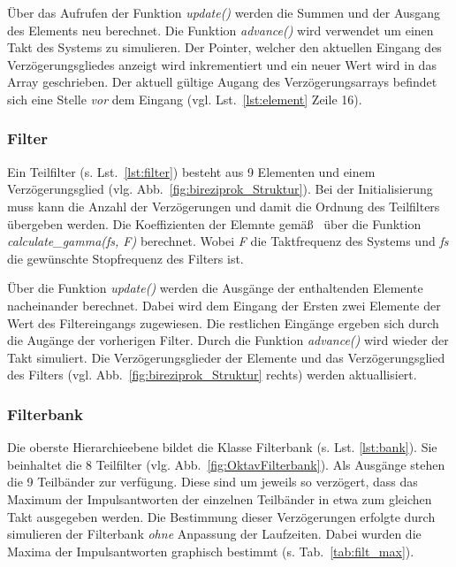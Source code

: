 Über das Aufrufen der Funktion \emph{update()} werden die Summen und der Ausgang des Elements neu berechnet. Die Funktion \emph{advance()} wird verwendet um einen Takt des Systems zu simulieren. Der Pointer, welcher den aktuellen Eingang des Verzögerungsgliedes anzeigt wird inkrementiert und ein neuer Wert wird in das Array geschrieben. Der aktuell gültige Augang des Verzögerungsarrays befindet sich eine Stelle \emph{vor} dem Eingang (vgl. Lst.~\ref{lst:element} Zeile 16).




\subsubsection{Filter}\label{sec:impl_Filter}
Ein Teilfilter (s. Lst.~\ref{lst:filter}) besteht aus 9 Elementen und einem Verzögerungsglied (vlg. Abb.~\ref{fig:bireziprok_Struktur}). Bei der Initialisierung muss kann die Anzahl der Verzögerungen und damit die Ordnung des Teilfilters übergeben werden. Die Koeffizienten der Elemnte gemäß~\cite{gaszi1983} über die Funktion \emph{calculate\_gamma(fs, F)} berechnet. Wobei \emph{F} die Taktfrequenz des Systems und \emph{fs} die gewünschte Stopfrequenz des Filters ist.

Über die Funktion \emph{update()} werden die Ausgänge der enthaltenden Elemente nacheinander berechnet. Dabei wird dem Eingang der Ersten zwei Elemente der Wert des Filtereingangs zugewiesen. Die restlichen Eingänge ergeben sich durch die Augänge der vorherigen Filter. Durch die Funktion \emph{advance()} wird wieder der Takt simuliert. Die Verzögerungsglieder der Elemente und das Verzögerungsglied des Filters (vgl. Abb.~\ref{fig:bireziprok_Struktur} rechts) werden aktuallisiert.



\subsubsection{Filterbank}\label{sec:impl_bank}
Die oberste Hierarchieebene bildet die Klasse Filterbank (s. Lst. \ref{lst:bank}). Sie beinhaltet die 8 Teilfilter (vlg. Abb.~\ref{fig:OktavFilterbank}). Als Ausgänge stehen die 9 Teilbänder zur verfügung. Diese sind um jeweils so verzögert, dass das Maximum der Impulsantworten der einzelnen Teilbänder in etwa zum gleichen Takt ausgegeben werden. Die Bestimmung dieser Verzögerungen erfolgte durch simulieren der Filterbank \emph{ohne} Anpassung der Laufzeiten. Dabei wurden die Maxima der Impulsantworten graphisch bestimmt (s. Tab.~\ref{tab:filt_max}).


